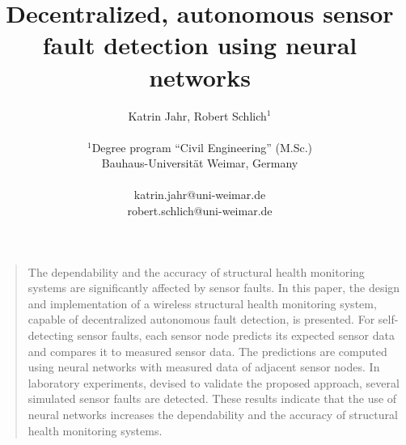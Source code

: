 \documentclass[12pt]{scrartcl}
\title{\textbf{ \Large{Decentralized, autonomous sensor fault detection using neural networks}} }
\author
{Katrin Jahr, Robert Schlich$^{1}$\\
\\
\normalsize{$^{1}$Degree program “Civil Engineering” (M.Sc.)}\\
\normalsize{Bauhaus-Universität Weimar, Germany}\\
\\
\normalsize{katrin.jahr@uni-weimar.de}\\
\normalsize{robert.schlich@uni-weimar.de}
}
\date{}
\newenvironment{sciabstract}{%
\begin{quote} \bf}
{\end{quote}}
\begin{document}
 


\baselineskip24pt


\maketitle 




\begin{sciabstract}


The dependability and the accuracy of structural health monitoring systems are significantly affected by sensor faults. 
In this paper, the design and implementation of a wireless structural health monitoring system, capable of decentralized autonomous fault detection, is presented. 
For self-detecting sensor faults, each sensor node predicts its expected sensor data and compares it to measured sensor data. 
The predictions are computed using neural networks with measured data of adjacent sensor nodes.
In laboratory experiments, devised to validate the proposed approach, several simulated sensor faults are detected.
These results indicate that the use of neural networks increases the dependability and the accuracy of structural health monitoring systems.





\end{sciabstract}
\end{document}
